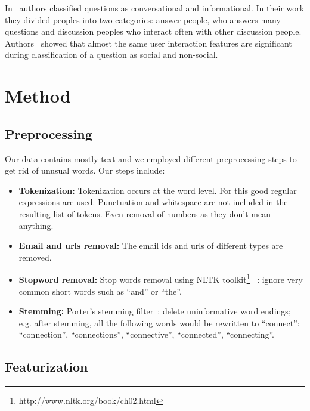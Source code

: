 \documentclass{article} %
\begin{document}
In~\cite{harper2009facts} authors classified questions as conversational and informational. In their work they divided peoples into two categories: answer people, who answers many questions and discussion peoples who interact often with other discussion people. Authors~\cite{mendes2009socializing} showed that almost the same user interaction features are significant during classification of a question as social and non-social.

\section{Method}
\subsection{Preprocessing}
\label{preprocess}

Our data contains mostly text and we employed different preprocessing steps to get rid of unusual words. Our steps include:
\begin{itemize}
    \item \textbf{Tokenization:} Tokenization occurs at the word level. For this good regular expressions are used. %
    Punctuation and whitespace are not included in the resulting list of tokens. Even removal of numbers as they don't mean anything.
    \item \textbf{Email and urls removal:} The email ids and urls of different types are removed.
    \item \textbf{Stopword removal:} Stop words removal using NLTK toolkit\footnote{http://www.nltk.org/book/ch02.html}~\cite{bird2009accessing} : ignore very common short words such as  ``and'' or ``the''.
    \item \textbf{Stemming:} Porter's stemming filter~\cite{porter1980algorithm}: delete uninformative word endings; e.g. after stemming, all the following words would be rewritten
  to ``connect'': ``connection'', ``connections'',
``connective'',          
``connected'',
  ``connecting''.
\end{itemize}

\subsection{Featurization}
\label{features}
\end{document}
